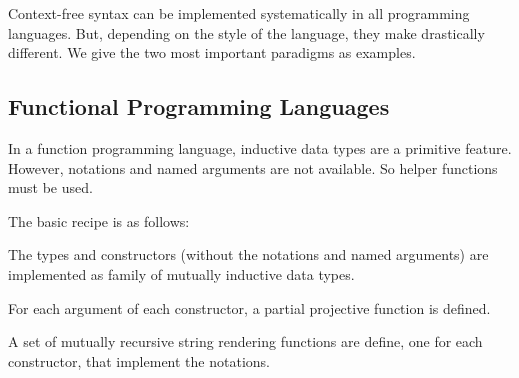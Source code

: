 Context-free syntax can be implemented systematically in all programming languages.
But, depending on the style of the language, they make drastically different.
We give the two most important paradigms as examples.

\subsection{Functional Programming Languages}

In a function programming language, inductive data types are a primitive feature.
However, notations and named arguments are not available.
So helper functions must be used.

The basic recipe is as follows:
\begin{compactitem}
\item The types and constructors (without the notations and named arguments) are implemented as family of mutually inductive data types.
\item For each argument of each constructor, a partial projective function is defined.
\item A set of mutually recursive string rendering functions are define, one for each constructor, that implement the notations.
\end{compactitem}

